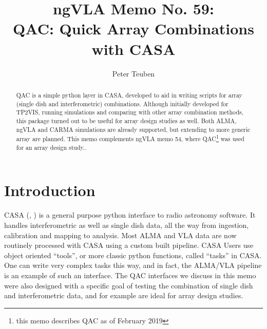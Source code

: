 \documentclass[11pt,twoside]{article}
\begin{document}
\title{ngVLA Memo No. 59: \\ QAC: Quick Array Combinations with CASA}
\author{Peter Teuben}



\begin{abstract}

QAC is a simple python layer in CASA, developed to aid in writing scripts
for array (single dish and interferometric) combinations. Although
initially developed for TP2VIS, running simulations and comparing with
other array combination methods, this package turned out to be useful
for array design studies as well. Both ALMA, ngVLA and CARMA
simulations are already supported, but extending to more generic array
are planned. This memo complements ngVLA memo 54, where
QAC\footnote{this memo describes QAC as of February 2019}
was used for an array design study..


\end{abstract}




\section{Introduction}

CASA (\citet{casa1}, \citet{casa2}) 
is a general purpose python interface to radio
astronomy software. It handles interferometric as well as single dish
data, all the way from ingestion, calibration and mapping to
analysis. Most ALMA and VLA data are now routinely processed with CASA
using a custom built pipeline.  CASA Users use object oriented
``tools'', or more classic python functions, called
``tasks'' in CASA. One can write very complex tasks this way, and in fact, the
ALMA/VLA pipeline is an example of such an interface. The QAC
interfaces we discuss in this memo were also designed with a specific
goal of testing the combination of single dish and interferometric data, and
for example are ideal for array design studies.

\end{document}
